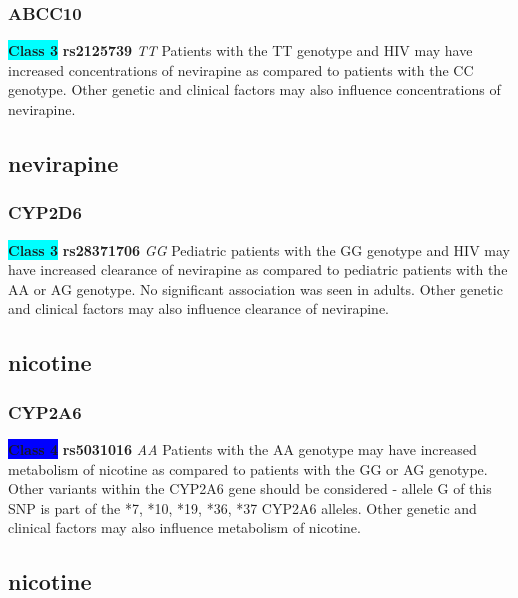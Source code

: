 \documentclass{book}
\begin{document}
\subsubsection{ ABCC10 }

\begin{center}
\textbf{\colorbox{cyan} {Class 3}} \textbf{ rs2125739 } \textit{ TT }
Patients with the TT genotype and HIV may have increased concentrations of nevirapine as compared to patients with the CC genotype. Other genetic and clinical factors may also influence concentrations of nevirapine.


\end{center}\subsection{ nevirapine }


\subsubsection{ CYP2D6 }

\begin{center}
\textbf{\colorbox{cyan} {Class 3}} \textbf{ rs28371706 } \textit{ GG }
Pediatric patients with the GG genotype and HIV may have increased clearance of nevirapine as compared to pediatric patients with the AA or AG genotype. No significant association was seen in adults. Other genetic and clinical factors may also influence clearance of nevirapine.


\end{center}\subsection{ nicotine }


\subsubsection{ CYP2A6 }

\begin{center}

\textbf{\colorbox{blue} {Class 4}} \textbf{ rs5031016 } \textit{ AA }
Patients with the AA genotype may have increased metabolism of nicotine as compared to patients with the GG or AG genotype. Other variants within the CYP2A6 gene should be considered - allele G of this SNP is part of the *7, *10, *19, *36, *37 CYP2A6 alleles. Other genetic and clinical factors may also influence metabolism of nicotine.

\end{center}\subsection{ nicotine }
\end{document}
